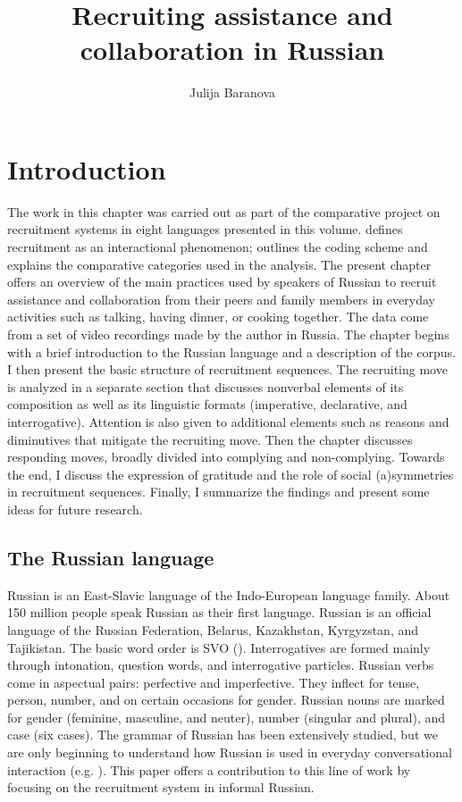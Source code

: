 \documentclass[output=paper,modfonts,nonflat]{langsci/langscibook}
\author{Julija Baranova\affiliation{Department of Language and Communication, Radboud University}}
\title{Recruiting assistance and collaboration in Russian}
\begin{document}
\maketitle
\label{sec:baranova}

\section{Introduction}

The work in this chapter was carried out as part of the comparative project on recruitment systems in eight languages presented in this volume.  defines recruitment as an interactional phenomenon;  outlines the coding scheme and explains the comparative categories used in the analysis. The present chapter offers an overview of the main practices used by speakers of Russian to recruit assistance and collaboration from their peers and family members in everyday activities such as talking, having dinner, or cooking together. The data come from a set of video recordings made by the author in Russia. The chapter begins with a brief introduction to the Russian language and a description of the corpus. I then present the basic structure of recruitment sequences. The recruiting move is analyzed in a separate section that discusses nonverbal elements of its composition as well as its linguistic formats (imperative, declarative, and interrogative). Attention is also given to additional elements such as reasons and diminutives that mitigate the recruiting move. Then the chapter discusses responding moves, broadly divided into complying and non-complying. Towards the end, I discuss the expression of gratitude and the role of social (a)symmetries in recruitment sequences. Finally, I summarize the findings and present some ideas for future research.

\subsection{The Russian language}

Russian is an East-Slavic language of the Indo-European language family. About 150 million people speak Russian as their first language. Russian is an official language of the Russian Federation, Belarus, Kazakhstan, Kyrgyzstan, and Tajikistan. The basic word order is SVO (\citealt{Hawkins1983,Tomlin1986}). Interrogatives are formed mainly through
intonation,
question words, and
interrogative particles.
Russian verbs come in aspectual pairs: perfective and imperfective. They inflect for tense, person, number, and on certain occasions for gender. Russian nouns are marked for gender (feminine, masculine, and neuter), number (singular and plural), and case (six cases). The grammar of Russian has been extensively studied, but we are only beginning to understand how Russian is used in everyday conversational interaction (e.g. \citealt{bolden_doing_2003,Bolden2004,Bolden2008,RobinsonBolden2010,Baranova2015,BaranovaDingemanse2016}). This paper offers a contribution to this line of work by focusing on the recruitment system in informal Russian.
\end{document}
